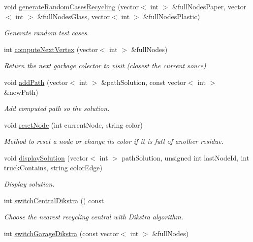 \begin{DoxyCompactItemize}
void \hyperlink{classSmartWaste_ad794e60b6202dc3a1e38d028be2195d1}{generate\+Random\+Cases\+Recycling} (vector$<$ int $>$ \&full\+Nodes\+Paper, vector$<$ int $>$ \&full\+Nodes\+Glass, vector$<$ int $>$ \&full\+Nodes\+Plastic)
\begin{DoxyCompactList}\small\item\em Generate random test cases. \end{DoxyCompactList}\item 
int \hyperlink{classSmartWaste_a5d8ac088738eff0f301a44468e64cd1a}{compute\+Next\+Vertex} (vector$<$ int $>$ \&full\+Nodes)
\begin{DoxyCompactList}\small\item\em Return the next garbage colector to visit (closest the current souce) \end{DoxyCompactList}\item 
void \hyperlink{classSmartWaste_aa55aa107bef64f322ea140103888c40b}{add\+Path} (vector$<$ int $>$ \&path\+Solution, const vector$<$ int $>$ \&new\+Path)
\begin{DoxyCompactList}\small\item\em Add computed path so the solution. \end{DoxyCompactList}\item 
void \hyperlink{classSmartWaste_a08307d41711fbdeb0993c146201f0e39}{reset\+Node} (int current\+Node, string color)
\begin{DoxyCompactList}\small\item\em Method to reset a node or change its color if it is full of another residue. \end{DoxyCompactList}\item 
void \hyperlink{classSmartWaste_a56980331c1909fce91ff215c58e770d3}{display\+Solution} (vector$<$ int $>$ path\+Solution, unsigned int last\+Node\+Id, int truck\+Contains, string color\+Edge)
\begin{DoxyCompactList}\small\item\em Display solution. \end{DoxyCompactList}\item 
int \hyperlink{classSmartWaste_a12ed73d4cb4116b279676f0393aa6c3b}{switch\+Central\+Dikstra} () const 
\begin{DoxyCompactList}\small\item\em Choose the nearest recycling central with Dikstra algorithm. \end{DoxyCompactList}\item 
int \hyperlink{classSmartWaste_aae9728f175078ad6323c67fb0b0afce0}{switch\+Garage\+Dikstra} (const vector$<$ int $>$ \&full\+Nodes)

\end{DoxyCompactItemize}

